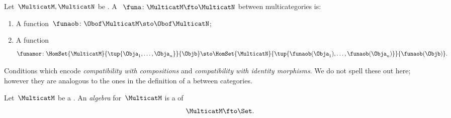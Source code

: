 \begin{ctdefinition}
    \label{def:functors-multicats}
    Let~$\MulticatM,\MulticatN$ be .
    A ~$\funa\colon \MulticatM \fto \MulticatN$ between multicategories is:

    \constit
    \begin{enumerate}
        \item A function~$\funaob\colon \Obof\MulticatM\sto \Obof\MulticatN$;
        \item A function
              \begin{equation}
                  \funamor\colon \HomSet{\MulticatM}{\tup{\Obja_1,\ldots,\Obja_n}}{\Objb}\sto \HomSet{\MulticatN}{\tup{\funaob(\Obja_1),\ldots, \funaob(\Obja_n)}}{\funaob(\Objb)}.
              \end{equation}
    \end{enumerate}

    \condit

    Conditions which encode \emph{compatibility with compositions} and \emph{compatibility with identity morphisms}.
    We do not spell these out here; however they are analogous to the ones in the definition of a  between categories.
\end{ctdefinition}


\begin{ctdefinition}
    \label{def:algebra-of-multicat}
    Let~$\MulticatM$ be a .
    An \emph{algebra} for~$\MulticatM$ is a  of 
    $$\MulticatM \fto \Set.
    $$
\end{ctdefinition}


